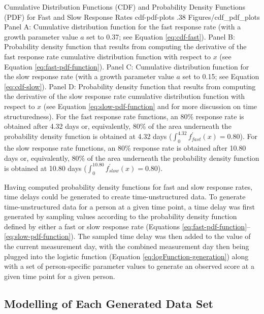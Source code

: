 \documentclass[
12pt, %
twoside,
english]{guelphthesis}
\begin{document}
\begin{apaFigure}
[portrait]
[samepage]
[0cm]
{Cumulative Distribution Functions (CDF) and Probability Density Functions (PDF) for Fast and Slow Response Rates}
{cdf-pdf-plots}
{.38}
{Figures/cdf_pdf_plots}
{Panel A: Cumulative distribution function for the fast response rate (with a growth parameter value $a$ set to 0.37; see Equation \ref{eq:cdf-fast}). Panel B: Probability density function that results from computing the derivative of the fast response rate cumulative distribution function with respect to $x$ (see Equation \ref{eq:fast-pdf-function}). Panel C: Cumulative distribution function for the slow response rate (with a growth parameter value $a$ set to 0.15; see Equation \ref{eq:cdf-slow}). Panel D: Probability density function that results from computing the derivative of the slow response rate cumulative distribution function with respect to $x$ (see Equation \ref{eq:slow-pdf-function} and  for more discussion on time structuredness). For the fast response rate functions, an 80\% response rate is obtained after 4.32 days or, equivalently, 80\% of the area underneath the probability density function is obtained at 4.32 days ($\int^{4.32}_{0} f_{fast}^\prime (x) = 0.80$). For the slow response rate functions, an 80\% response rate is obtained after 10.80 days or, equivalently, 80\% of the area underneath the probability density function is obtained at 10.80 days ($\int^{10.80}_{0} f_{slow}^\prime (x) = 0.80$).}
\end{apaFigure}
Having computed probability density functions for fast and slow response rates, time delays could be generated to create time-unstructured data. To generate time-unstructured data for a person at a given time point, a time delay was first
generated by sampling values according to the probability density function defined by either a fast or slow response rate (Equations \ref{eq:fast-pdf-function}--\ref{eq:slow-pdf-function}). The sampled time delay was then added to the value of the current measurement day, with the combined measurement day then being plugged into the logistic function (Equation \ref{eq:logFunction-generation}) along with a set of person-specific parameter values to generate an observed score at a given time point for a given person.

\hypertarget{data-modelling-exp3}{%
\subsection{Modelling of Each Generated Data Set}\label{data-modelling-exp3}}
\end{document}
